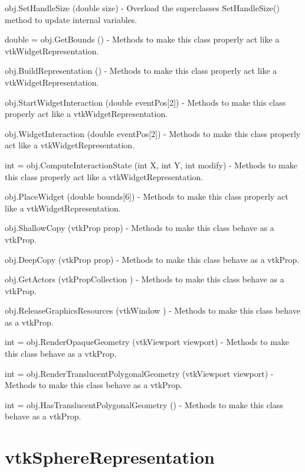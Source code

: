 \begin{DoxyItemize}
\item {\ttfamily obj.\-Set\-Handle\-Size (double size)} -\/ Overload the superclasses Set\-Handle\-Size() method to update internal variables.  
\item {\ttfamily double = obj.\-Get\-Bounds ()} -\/ Methods to make this class properly act like a vtk\-Widget\-Representation.  
\item {\ttfamily obj.\-Build\-Representation ()} -\/ Methods to make this class properly act like a vtk\-Widget\-Representation.  
\item {\ttfamily obj.\-Start\-Widget\-Interaction (double event\-Pos\mbox{[}2\mbox{]})} -\/ Methods to make this class properly act like a vtk\-Widget\-Representation.  
\item {\ttfamily obj.\-Widget\-Interaction (double event\-Pos\mbox{[}2\mbox{]})} -\/ Methods to make this class properly act like a vtk\-Widget\-Representation.  
\item {\ttfamily int = obj.\-Compute\-Interaction\-State (int X, int Y, int modify)} -\/ Methods to make this class properly act like a vtk\-Widget\-Representation.  
\item {\ttfamily obj.\-Place\-Widget (double bounds\mbox{[}6\mbox{]})} -\/ Methods to make this class properly act like a vtk\-Widget\-Representation.  
\item {\ttfamily obj.\-Shallow\-Copy (vtk\-Prop prop)} -\/ Methods to make this class behave as a vtk\-Prop.  
\item {\ttfamily obj.\-Deep\-Copy (vtk\-Prop prop)} -\/ Methods to make this class behave as a vtk\-Prop.  
\item {\ttfamily obj.\-Get\-Actors (vtk\-Prop\-Collection )} -\/ Methods to make this class behave as a vtk\-Prop.  
\item {\ttfamily obj.\-Release\-Graphics\-Resources (vtk\-Window )} -\/ Methods to make this class behave as a vtk\-Prop.  
\item {\ttfamily int = obj.\-Render\-Opaque\-Geometry (vtk\-Viewport viewport)} -\/ Methods to make this class behave as a vtk\-Prop.  
\item {\ttfamily int = obj.\-Render\-Translucent\-Polygonal\-Geometry (vtk\-Viewport viewport)} -\/ Methods to make this class behave as a vtk\-Prop.  
\item {\ttfamily int = obj.\-Has\-Translucent\-Polygonal\-Geometry ()} -\/ Methods to make this class behave as a vtk\-Prop.  
\end{DoxyItemize}\hypertarget{vtkwidgets_vtksphererepresentation}{}\section{vtk\-Sphere\-Representation}\label{vtkwidgets_vtksphererepresentation}
